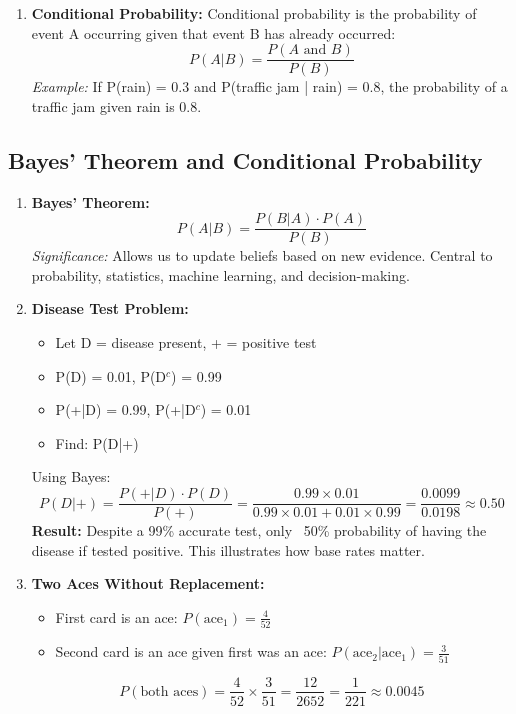 \begin{enumerate}
    \item \textbf{Conditional Probability:}
    Conditional probability is the probability of event A occurring given that event B has already occurred:
    \begin{equation}
        P(A|B) = \frac{P(A \text{ and } B)}{P(B)}
    \end{equation}
    \textit{Example:} If P(rain) = 0.3 and P(traffic jam | rain) = 0.8, the probability of a traffic jam given rain is 0.8.
\end{enumerate}

\subsection{Bayes' Theorem and Conditional Probability}

\begin{enumerate}
    \item \textbf{Bayes' Theorem:}
    \begin{equation}
        P(A|B) = \frac{P(B|A) \cdot P(A)}{P(B)}
    \end{equation}
    \textit{Significance:} Allows us to update beliefs based on new evidence. Central to probability, statistics, machine learning, and decision-making.
    
    \item \textbf{Disease Test Problem:}
    \begin{itemize}
        \item Let D = disease present, + = positive test
        \item P(D) = 0.01, P(D$^c$) = 0.99
        \item P(+|D) = 0.99, P(+|D$^c$) = 0.01
        \item Find: P(D|+)
    \end{itemize}
    Using Bayes:
    \begin{equation}
        P(D|+) = \frac{P(+|D) \cdot P(D)}{P(+)} = \frac{0.99 \times 0.01}{0.99 \times 0.01 + 0.01 \times 0.99} = \frac{0.0099}{0.0198} \approx 0.50
    \end{equation}
    \textbf{Result:} Despite a 99\% accurate test, only ~50\% probability of having the disease if tested positive. This illustrates how base rates matter.
    
    \item \textbf{Two Aces Without Replacement:}
    \begin{itemize}
        \item First card is an ace: $P(\text{ace}_1) = \frac{4}{52}$
        \item Second card is an ace given first was an ace: $P(\text{ace}_2 | \text{ace}_1) = \frac{3}{51}$
    \end{itemize}
    \begin{equation}
        P(\text{both aces}) = \frac{4}{52} \times \frac{3}{51} = \frac{12}{2652} = \frac{1}{221} \approx 0.0045
    \end{equation}
    

\end{enumerate}
